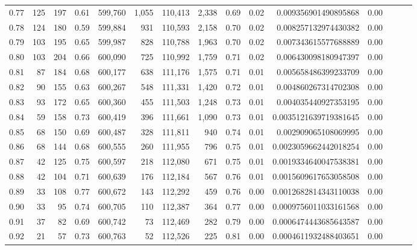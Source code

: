 \begin{tabular}{rrrrrrrrrrrrrrr}
0.77 &     125 &    197 &  0.61 &  599,760 &    1,055 &  110,413 &    2,338 &  0.69 &  0.02 &    0.009356901490895868 &      0.00 \\
0.78 &     124 &    180 &  0.59 &  599,884 &      931 &  110,593 &    2,158 &  0.70 &  0.02 &    0.008257132974430382 &      0.00 \\
0.79 &     103 &    195 &  0.65 &  599,987 &      828 &  110,788 &    1,963 &  0.70 &  0.02 &    0.007343615577688889 &      0.00 \\
0.80 &     103 &    204 &  0.66 &  600,090 &      725 &  110,992 &    1,759 &  0.71 &  0.02 &    0.006430098180947397 &      0.00 \\
0.81 &      87 &    184 &  0.68 &  600,177 &      638 &  111,176 &    1,575 &  0.71 &  0.01 &    0.005658486399233709 &      0.00 \\
0.82 &      90 &    155 &  0.63 &  600,267 &      548 &  111,331 &    1,420 &  0.72 &  0.01 &    0.004860267314702308 &      0.00 \\
0.83 &      93 &    172 &  0.65 &  600,360 &      455 &  111,503 &    1,248 &  0.73 &  0.01 &    0.004035440927353195 &      0.00 \\
0.84 &      59 &    158 &  0.73 &  600,419 &      396 &  111,661 &    1,090 &  0.73 &  0.01 &   0.0035121639719381645 &      0.00 \\
0.85 &      68 &    150 &  0.69 &  600,487 &      328 &  111,811 &      940 &  0.74 &  0.01 &    0.002909065108069995 &      0.00 \\
0.86 &      68 &    144 &  0.68 &  600,555 &      260 &  111,955 &      796 &  0.75 &  0.01 &   0.0023059662442018254 &      0.00 \\
0.87 &      42 &    125 &  0.75 &  600,597 &      218 &  112,080 &      671 &  0.75 &  0.01 &   0.0019334640047538381 &      0.00 \\
0.88 &      42 &    104 &  0.71 &  600,639 &      176 &  112,184 &      567 &  0.76 &  0.01 &   0.0015609617653058508 &      0.00 \\
0.89 &      33 &    108 &  0.77 &  600,672 &      143 &  112,292 &      459 &  0.76 &  0.00 &   0.0012682814343110038 &      0.00 \\
0.90 &      33 &     95 &  0.74 &  600,705 &      110 &  112,387 &      364 &  0.77 &  0.00 &   0.0009756011033161568 &      0.00 \\
0.91 &      37 &     82 &  0.69 &  600,742 &       73 &  112,469 &      282 &  0.79 &  0.00 &   0.0006474443685643587 &      0.00 \\
0.92 &      21 &     57 &  0.73 &  600,763 &       52 &  112,526 &      225 &  0.81 &  0.00 &   0.0004611932488403651 &      0.00 \\

\end{tabular}
